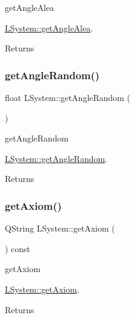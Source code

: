 get\+Angle\+Alea 

\hyperlink{classLSystem_aa6cc5c18686831374eafcfda3c96d392}{L\+System\+::get\+Angle\+Alea}.

\begin{DoxyReturn}{Returns}

\end{DoxyReturn}
\mbox{\label{classLSystem_a2f5928d5bbfc537395e5c5f134f2b1e3}} 
\subsubsection{\texorpdfstring{get\+Angle\+Random()}{getAngleRandom()}}
{\footnotesize\ttfamily float L\+System\+::get\+Angle\+Random (\begin{DoxyParamCaption}{ }\end{DoxyParamCaption})}



get\+Angle\+Random 

\hyperlink{classLSystem_a2f5928d5bbfc537395e5c5f134f2b1e3}{L\+System\+::get\+Angle\+Random}.

\begin{DoxyReturn}{Returns}

\end{DoxyReturn}
\mbox{\label{classLSystem_aa5ac6cf5036d466402a6cb8eb7151abe}} 
\subsubsection{\texorpdfstring{get\+Axiom()}{getAxiom()}}
{\footnotesize\ttfamily Q\+String L\+System\+::get\+Axiom (\begin{DoxyParamCaption}{ }\end{DoxyParamCaption}) const}



get\+Axiom 

\hyperlink{classLSystem_aa5ac6cf5036d466402a6cb8eb7151abe}{L\+System\+::get\+Axiom}.

\begin{DoxyReturn}{Returns}

\end{DoxyReturn}
\mbox{\label{classLSystem_a8d4fb387b953c1e98ee02d24ca7c9770}} 
